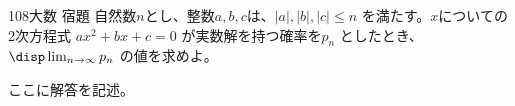 \begin{prob}{108}{}{大数 宿題}
 自然数$n$とし、整数$a, b, c$は、$|a|, |b|, |c| \le n$ を満たす。$x$についての2次方程式 $ax^2+bx+c=0$ が実数解を持つ確率を$p_n$ としたとき、$\disp \lim_{n\to\infty} p_n$ の値を求めよ。
\end{prob}
ここに解答を記述。